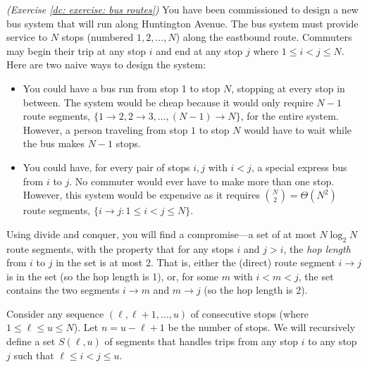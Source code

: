\documentclass[11pt]{article}
\begin{document}



\newpage
\newcommand{\segment}[2]{#1\!\to\! #2}
\problem \emph{(Exercise \ref{dc: exercise: bus routes})}
You have been commissioned to design a new bus system that will run along Huntington Avenue.  The bus system must provide service to $N$ stops (numbered $1,2,\ldots,N$) along the eastbound route.  Commuters may begin their trip at any stop $i$ and end at any stop $j$ where $1\le i < j \le N$.  
Here are two naive ways to design the system:
\begin{itemize}
\item You could have a bus run from stop 1 to stop $N$, stopping at every stop in between. The system would be cheap because it would only require $N-1$ route segments, $\{\segment 1 2, \segment 2 3, \ldots, \segment{(N-1)}N\}$, for the entire system. However, a person traveling from stop $1$ to stop $N$ would have to wait while the bus makes $N-1$ stops.

\item You could have, for every pair of stops $i, j$ with $i < j$, a special express bus from $i$ to $j$.
  No commuter would ever have to make more than one stop.
  However, this system would be expensive as it requires ${N \choose 2} = \Theta(N^2)$ route segments,
  $\{\segment i j : 1\le i < j \le N\}$.
  
\end{itemize}

Using divide and conquer, you will find a compromise---a set of at most $N \log_2 N$ route segments, with the property that for any stops $i$ and $j > i$, the \emph{hop length} from $i$ to $j$ in the set is at most 2.
That is, either the (direct) route segment $\segment i j$ is in the set (so the hop length is 1),
or, for some $m$ with $i<m<j$, the set contains the two segments $\segment i m$ and  $\segment m j$
(so the hop length is 2).

Consider any sequence $(\ell, \ell+1, \ldots, u)$ of consecutive stops (where $1\le \ell \le u \le N$).
Let $n = u-\ell+1$ be the number of stops.
We will recursively define a set $S(\ell, u)$ of segments that handles trips from any stop $i$ to any stop $j$
such that $\ell \le i < j \le u$.
\end{document}
